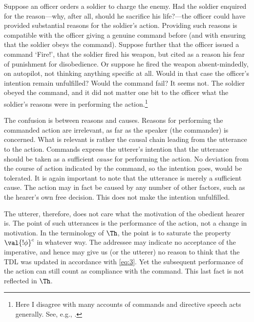 Suppose an officer orders a soldier to charge the enemy. Had the soldier enquired for the reason---why, after all, should he sacrifice his life?---the officer could have provided substantial reasons for the soldier's action. Providing such reasons is compatible with the officer giving a genuine command before (and with ensuring that the soldier obeys the command). Suppose further that the officer issued a command `Fire!', that the soldier fired his weapon, but cited as a reason his fear of punishment for disobedience. Or suppose he fired the weapon absent-mindedly, on autopilot, not thinking anything specific at all. Would in that case the officer's intention remain unfulfilled? Would the command fail? It seems not. The soldier obeyed the command, and it did not matter one bit to the officer what the soldier's reasons were in performing the action.\footnote{Here I disagree with many accounts of commands and directive speech acts generally. See, e.g., \citet[105]{Kis13}.}

The confusion is between reasons and causes. Reasons for performing the commanded action are irrelevant, as far as the speaker (the commander) is concerned. What is relevant is rather the causal chain leading from the utterance to the action. Commands express the utterer's intention that the utterance should be taken as a sufficient \emph{cause} for performing the action. No deviation from the course of action indicated by the command, so the intention goes, would be tolerated. It is again important to note that the utterance is merely a sufficient cause. The action may in fact be caused by any number of other factors, such as the hearer's own free decision. This does not make the intention unfulfilled.

The utterer, therefore, does not care what the motivation of the obedient hearer is. The point of such utterances is the performance of the action, not a change in motivation. In the terminology of $\Th$, the point is to saturate the property $\val{!\phi}^c$ in whatever way. The addressee may indicate no acceptance of the imperative, and hence may give us (or the utterer) no reason to think that the TDL was updated in accordance with \eqref{eq:3}. Yet the subsequent performance of the action can still count as compliance with the command. This last fact is not reflected in $\Th$.


